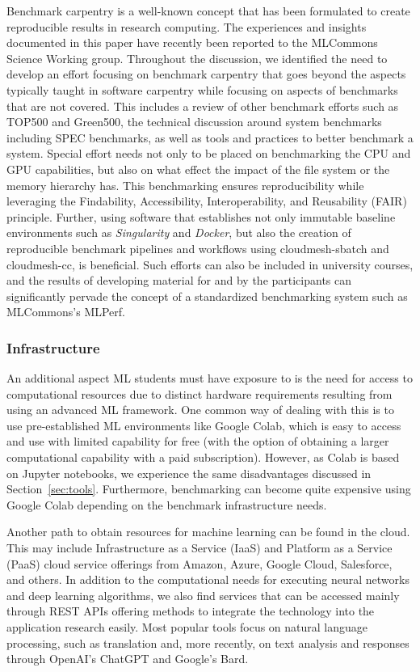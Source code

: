 \documentclass[utf8]{FrontiersinVancouver} %
\begin{document}
Benchmark carpentry is a well-known concept that has been formulated to create reproducible results in research computing.  The experiences and insights documented in this paper have recently been reported to the MLCommons Science Working group. Throughout the discussion, we identified the need to develop an effort focusing on benchmark carpentry that goes beyond the aspects typically taught in software carpentry while focusing on aspects of benchmarks that are not covered. This includes a review of other benchmark efforts such as TOP500 and Green500, the technical discussion around system benchmarks including SPEC benchmarks, as well as tools and practices to better benchmark a system. Special effort needs not only to be placed on benchmarking the CPU and GPU capabilities, but also on what effect the impact of the file system or the memory hierarchy has. This benchmarking ensures reproducibility while leveraging the Findability, Accessibility, Interoperability, and Reusability (FAIR) principle. Further, using software that establishes not only immutable baseline environments such as {\em Singularity} and {\em Docker}, but also the creation of reproducible benchmark pipelines and workflows using cloudmesh-sbatch and cloudmesh-cc, is beneficial. Such efforts can also be included in university courses, and the results of developing material for and by the participants can significantly pervade the concept of a standardized benchmarking system such as MLCommons's MLPerf.

\subsubsection{Infrastructure}

An additional aspect ML students must have exposure to is the need for access to computational resources due to distinct hardware requirements resulting from using an advanced ML framework. One common way of dealing with this is to use pre-established ML environments like Google Colab, which is easy to access and use with limited capability for free (with the option of obtaining a larger computational capability with a paid subscription).  However, as Colab is based on Jupyter notebooks, we experience the same disadvantages discussed in Section~\ref{sec:tools}. Furthermore, benchmarking can become quite expensive using Google Colab depending on the benchmark infrastructure needs.

Another path to obtain resources for machine learning can be found in the cloud. This may include Infrastructure as a Service (IaaS) and Platform as a Service (PaaS) cloud service offerings from Amazon, Azure, Google Cloud, Salesforce, and others. In addition to the computational needs for executing neural networks and deep learning algorithms, we also find services that can be accessed mainly through REST APIs offering methods to integrate the technology into the application research easily. Most popular tools focus on natural language processing, such as translation and, more recently, on text analysis and responses through OpenAI's ChatGPT and Google's Bard.
\end{document}
